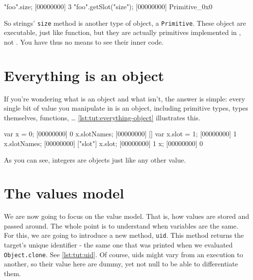 \begin{urbiscript}[caption=Primitives, label=lst:tut:getslot-primitive]
"foo".size;
[00000000] 3
"foo".getSlot("size");
[00000000] Primitive_0x0
\end{urbiscript}

So strings' \lstinline{size} method is another type of object, a
\lstinline{Primitive}. These object are executable, just like function,
but they are actually primitives implemented in \Cxx, not \us. You
have thus no means to see their inner code.

\section{Everything is an object}

If you're wondering what is an object and what isn't, the answer is
simple: every single bit of value you manipulate in \us is an
object, including primitive types, types themselves, functions, \ldots
\autoref{lst:tut:everything-object} illustrates this.

\begin{urbiscript}[caption=Everything is an object,
label=lst:tut:everything-object]
var x = 0;
[00000000] 0
x.slotNames;
[00000000] []
var x.slot = 1;
[00000000] 1
x.slotNames;
[00000000] ["slot"]
x.slot;
[00000000] 1
x;
[00000000] 0
\end{urbiscript}

As you can see, integers are objects just like any other value.

\section{The \us values model}

We are now going to focus on the \us value model. That is, how
values are stored and passed around. The whole point is to understand
when variables are the same. For this, we are going to introduce a new
method, \lstinline{uid}. This method returns the target's unique
identifier - the same one that was printed when we evaluated
\lstinline|Object.clone|. See \autoref{lst:tut:uid}. Of course, uids might vary
from an execution to another, so their value here are dummy, yet not
null to be able to differentiate them.

